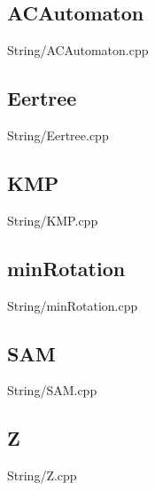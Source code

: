     \subsection{ACAutomaton}
         {String/ACAutomaton.cpp}
    \subsection{Eertree}
         {String/Eertree.cpp}
    \subsection{KMP}
         {String/KMP.cpp}
    \subsection{minRotation}
         {String/minRotation.cpp}
    \subsection{SAM}
         {String/SAM.cpp}
    \subsection{Z}
         {String/Z.cpp}
